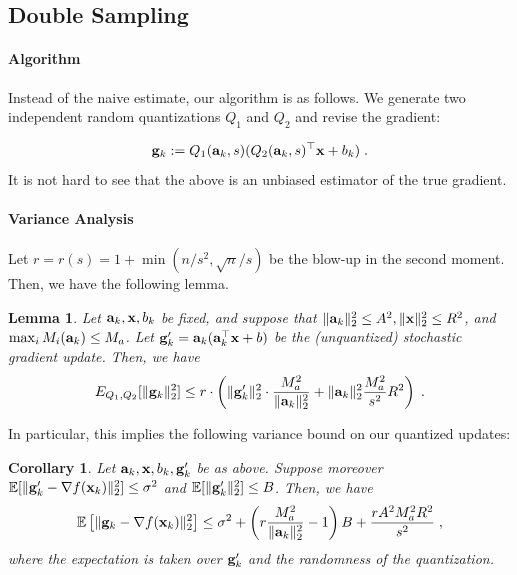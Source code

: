 \documentclass{article}
\def\a{{\bf a}}
\def\g{{\bf g}}
\def\x{{\bf x}}
\def\E{\mathbb{E}}
\newtheorem{lemma}{Lemma}
\newtheorem{corollary}{Corollary}
\begin{document}
\subsection{Double Sampling}

\paragraph{Algorithm}
Instead of the naive estimate, our algorithm is as follows.
We generate two independent
random quantizations $Q_1$
and $Q_2$ and revise the gradient:


\[
\g_k := Q_1 (\a_k, s) (Q_2 (\a_k, s)^\top \x + b_k) \; .
\]
It is not hard to see that the above is an unbiased estimator of the true gradient.

\paragraph{Variance Analysis}

Let $r = r(s) = 1 + \min (n / s^2, \sqrt{n}/ s)$ be the blow-up in the second moment.
Then, we have the following lemma.
\begin{lemma}
\label{lem:qbound}
    Let $\a_k, \x, b_k$ be fixed, and suppose that $\| \a_k \|_2^2 \leq A^2, \| \x \|_2^2 \leq R^2$, and $\max_i M_i (\a_k) \leq M_a$.
    Let $\g'_k = \a_k (\a_k^\top \x + b)$ be the (unquantized) stochastic gradient update.
    Then, we have 
    \[
    E_{Q_1, Q_2} [\| \g_k \|_2^2] \leq r \cdot \left( \| \g'_k \|_2^2 \cdot \frac{M_a^2}{\| \a_k \|_2^2} + \| \a_k \|_2^2 \frac{M_a^2}{s^2} R^2 \right)\; .
    \]
\end{lemma}

In particular, this implies the following variance bound on our quantized updates:
\begin{corollary}
    Let $\a_k, \x, b_k, \g'_k$ be as above.
    Suppose moreover $\E [\| \g'_k - \nabla f(\x_k) \|_2^2 ] \leq \sigma^2$ and $\E [\| \g'_k \|_2^2] \leq B$.
    Then, we have
    \[
    \E \left[ \| \g_k - \nabla f(\x_k) \|_2^2 \right] \leq  \sigma^2 + \left(r \frac{M_a^2}{\| \a_k \|_2^2} - 1\right) B + \frac{r A^2 M_a^2 R^2}{s^2} \; ,
    \]
    where the expectation is taken over $\g'_k$ and the randomness of the quantization.
\end{corollary}
\end{document}
